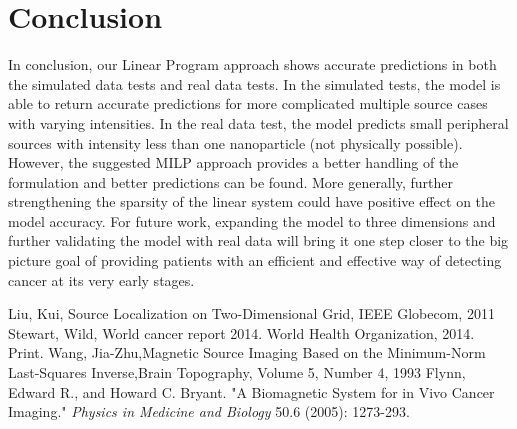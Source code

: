 \documentclass[a4paper]{article}
\begin{document}
\section{Conclusion}

In conclusion, our Linear Program approach shows accurate predictions in both the simulated data tests and real data tests. In the simulated tests, the model is able to return accurate predictions for more complicated multiple source cases with varying intensities. 
In the real data test, the model predicts small peripheral sources with intensity less than one nanoparticle (not physically possible). However, the suggested MILP approach provides a better handling of the formulation and better predictions can be found. More generally, further strengthening the sparsity of the linear system could have positive effect on the model accuracy. For future work, expanding the model to three dimensions and further validating the model with real data will bring it one step closer to the big picture goal of providing patients with an efficient and effective way of detecting cancer at its very early stages.

\begin{thebibliography}{3} 
 Liu, Kui, Source Localization on Two-Dimensional Grid, IEEE Globecom, 2011
 Stewart, Wild, World cancer report 2014. World Health Organization, 2014. Print.
 Wang, Jia-Zhu,Magnetic Source Imaging Based on the Minimum-Norm Last-Squares Inverse,Brain Topography, Volume 5, Number 4, 1993 
 Flynn, Edward R., and Howard C. Bryant. "A Biomagnetic System for in Vivo Cancer Imaging." \emph{ Physics in Medicine and Biology} 50.6 (2005): 1273-293.

\end{thebibliography}
\end{document}

